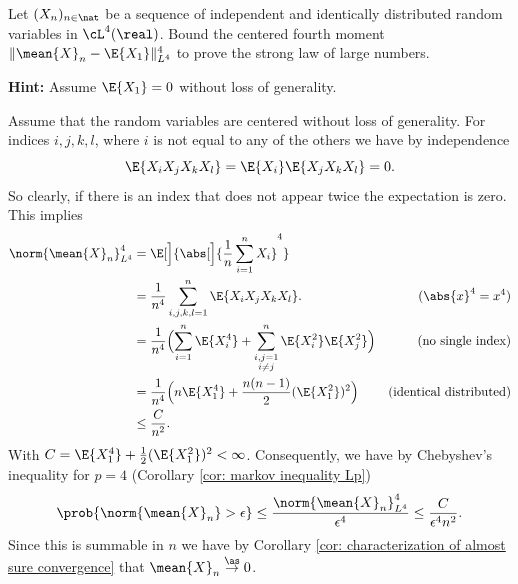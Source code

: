 \begin{exercise}
    \label{ex: strong law of large numbers in L4}
    Let \((X_n)_{n\in \nat}\) be a sequence of independent and identically
    distributed random variables in \(\cL^4(\real)\). Bound the centered fourth moment
    \(\|\mean{X}_n - \E{X_1}\|_{L^4}^4\) to prove the strong law of large numbers.

    \noindent\textbf{Hint:} Assume \(\E{X_1} = 0\) without loss of generality.

    \begin{solution}
        Assume that the random variables are centered without loss of generality.
        For indices \(i,j,k,l\), where \(i\) is not equal to any of the others
        we have by independence
        \[
            \E{X_i X_j X_k X_l} = \E{X_i}\E{X_jX_k X_l} = 0.
        \]
        So clearly, if there is an index that does not appear twice the expectation is zero.
        This implies
        \[\begin{aligned}
            \norm{\mean{X}_n}_{L^4}^4
            &= \E[\Big]{\abs[\Big]{\frac1n \sum_{i=1}^n X_i}^4}
            \\
            &= \frac1{n^4} \sum_{i,j,k,l=1}^n \E{X_i X_j X_k X_l}.
            & (\abs{x}^4=x^4)
            \\
            &= \frac1{n^4} \Bigl(
                \sum_{i=1}^n \E{X_i^4}
                + \sum_{\substack{i,j=1\\i\neq j}}^n \E{X_i^2}\E{X_j^2}
            \Bigr)
            & (\text{no single index})
            \\
            &=
            \frac1{n^4}\Bigl(n\E{X_1^4} + \frac{n(n-1)}{2} (\E{X_1^2})^2\Bigr)
            &(\text{identical distributed})
            \\
            &\le \frac{C}{n^2}.
        \end{aligned}
        \]
        With \(C = \E{X_1^4} + \frac12 (\E{X_1^2})^2 < \infty\). Consequently, we have
        by Chebyshev's inequality for \(p=4\) (Corollary \ref{cor: markov inequality Lp})
        \[
            \prob{\norm{\mean{X}_n} > \epsilon} \le \frac{\norm{\mean{X}_n}_{L^4}^4}{\epsilon^4} \le \frac{C}{\epsilon^4 n^2}.
        \]
        Since this is summable in \(n\) we have by Corollary \ref{cor:
        characterization of almost sure convergence} that \(\mean{X}_n
        \overset{\as}\to 0\).
    \end{solution}
\end{exercise}

